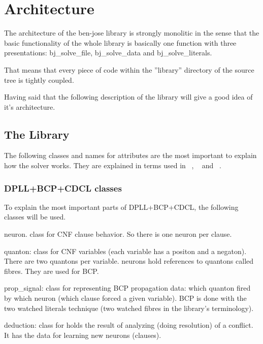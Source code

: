 \documentclass{easychair}
\newcommand{\neuron}{\textsf{neuron}}
\newcommand{\quanton}{\textsf{quanton}}
\newcommand{\propsignal}{\textsf{prop\_signal}}
\newcommand{\deduction}{\textsf{deduction}}
\newcommand{\bjsolvefile}{bj\_solve\_file}
\newcommand{\bjsolvedata}{bj\_solve\_data}
\newcommand{\bjsolveliterals}{bj\_solve\_literals}
\begin{document}
\section{Architecture}
\label{sect:architecture}

The architecture of the ben-jose library is strongly monolitic in the sense that the basic functionality of the whole library is basically one function with three presentations: {\bjsolvefile}, {\bjsolvedata} and {\bjsolveliterals}.

That means that every piece of code within the ''library'' directory of the source tree is tightly coupled.

Having said that the following description of the library will give a good idea of it's architecture.

\subsection{The Library}

The following classes and names for attributes are the most important to explain how the solver works. They are explained in terms used in ~\cite{silva-95}, ~\cite{moskewicz-01} and  ~\cite{bastert-02}.

\subsubsection{DPLL+BCP+CDCL classes}

To explain the most important parts of  DPLL+BCP+CDCL, the following classes will be used.

{\neuron}. class for CNF clause behavior. So there is one {\neuron} per clause.

{\quanton}: class for CNF variables (each variable has a positon and a negaton). There are two {\quanton}s per variable. {\neuron}s hold references to {\quanton}s called fibres. They are used for BCP.

{\propsignal}: class for representing BCP propagation data: which {\quanton} fired by which {\neuron} (which clause forced a given variable). BCP is done with the two watched literals technique (two watched fibres in the library's terminology).

{\deduction}: class for holds the result of analyzing (doing resolution) of a conflict. It has the data for learning new {\neuron}s (clauses).
\end{document}
